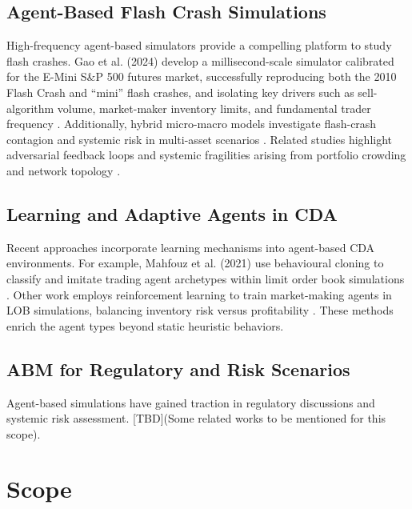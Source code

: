 \documentclass[conference, 12pt]{IEEEtran}
\begin{document}
\subsection{Agent-Based Flash Crash Simulations}
High-frequency agent-based simulators provide a compelling platform to study flash crashes. Gao et al. (2024) develop a millisecond-scale simulator calibrated for the E-Mini S\&P 500 futures market, successfully reproducing both the 2010 Flash Crash and “mini” flash crashes, and isolating key drivers such as sell-algorithm volume, market-maker inventory limits, and fundamental trader frequency \cite{gao2022high}. Additionally, hybrid micro-macro models investigate flash-crash contagion and systemic risk in multi-asset scenarios \cite{paulin2019understanding}. Related studies highlight adversarial feedback loops and systemic fragilities arising from portfolio crowding and network topology \cite{paulin2019understanding}.

\subsection{Learning and Adaptive Agents in CDA}
Recent approaches incorporate learning mechanisms into agent-based CDA environments. For example, Mahfouz et al. (2021) use behavioural cloning to classify and imitate trading agent archetypes within limit order book simulations \cite{mahfouz2021learning}. Other work employs reinforcement learning to train market-making agents in LOB simulations, balancing inventory risk versus profitability \cite{beysolow2019market}. These methods enrich the agent types beyond static heuristic behaviors.

\subsection{ABM for Regulatory and Risk Scenarios}
Agent-based simulations have gained traction in regulatory discussions and systemic risk assessment. [TBD](Some related works to be mentioned for this scope).

\section{Scope}
\end{document}
